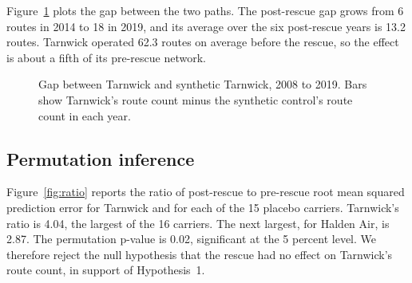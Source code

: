 \documentclass[12pt]{article}
\begin{document}
Figure~\ref{fig:gap} plots the gap between the two paths. The post-rescue gap grows from 6 routes in 2014 to 18 in 2019, and its average over the six post-rescue years is 13.2 routes. Tarnwick operated 62.3 routes on average before the rescue, so the effect is about a fifth of its pre-rescue network.

\begin{figure}[ht]
\centering
{}
\caption{Gap between Tarnwick and synthetic Tarnwick, 2008 to 2019. Bars show Tarnwick's route count minus the synthetic control's route count in each year.}
\label{fig:gap}
\end{figure}

\subsection{Permutation inference}

Figure~\ref{fig:ratio} reports the ratio of post-rescue to pre-rescue root mean squared prediction error for Tarnwick and for each of the 15 placebo carriers. Tarnwick's ratio is 4.04, the largest of the 16 carriers. The next largest, for Halden Air, is 2.87. The permutation p-value is 0.02, significant at the 5 percent level. We therefore reject the null hypothesis that the rescue had no effect on Tarnwick's route count, in support of Hypothesis~1.
\end{document}
